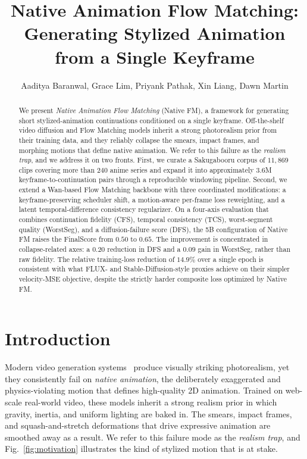 \documentclass[10pt,twocolumn]{article}
\title{\textbf{Native Animation Flow Matching: \\
Generating Stylized Animation from a Single Keyframe}}
\author{
Aaditya Baranwal, Grace Lim, Priyank Pathak, Xin Liang, Dawn Martin}
\date{}
\begin{document}
\maketitle

\begin{abstract}
We present \emph{Native Animation Flow Matching} (Native FM), a framework for generating short stylized-animation continuations conditioned on a single keyframe. Off-the-shelf video diffusion and Flow Matching models inherit a strong photorealism prior from their training data, and they reliably collapse the smears, impact frames, and morphing motions that define native animation. We refer to this failure as the \emph{realism trap}, and we address it on two fronts. First, we curate a Sakugabooru corpus of $11{,}869$ clips covering more than $240$ anime series and expand it into approximately $3.6$M keyframe-to-continuation pairs through a reproducible windowing pipeline. Second, we extend a Wan-based Flow Matching backbone with three coordinated modifications: a keyframe-preserving scheduler shift, a motion-aware per-frame loss reweighting, and a latent temporal-difference consistency regularizer. On a four-axis evaluation that combines continuation fidelity (CFS), temporal consistency (TCS), worst-segment quality (WorstSeg), and a diffusion-failure score (DFS), the 5B configuration of Native FM raises the FinalScore from $0.50$ to $0.65$. The improvement is concentrated in collapse-related axes: a $0.20$ reduction in DFS and a $0.09$ gain in WorstSeg, rather than raw fidelity. The relative training-loss reduction of $14.9\%$ over a single epoch is consistent with what FLUX- and Stable-Diffusion-style proxies achieve on their simpler velocity-MSE objective, despite the strictly harder composite loss optimized by Native FM.
\end{abstract}

\section{Introduction}

Modern video generation systems~\cite{ho2022video, blattmann2023stable, wan2025team} produce visually striking photorealism, yet they consistently fail on \emph{native animation}, the deliberately exaggerated and physics-violating motion that defines high-quality 2D animation. Trained on web-scale real-world video, these models inherit a strong realism prior in which gravity, inertia, and uniform lighting are baked in. The smears, impact frames, and squash-and-stretch deformations that drive expressive animation are smoothed away as a result. We refer to this failure mode as the \emph{realism trap}, and Fig.~\ref{fig:motivation} illustrates the kind of stylized motion that is at stake.
\end{document}

